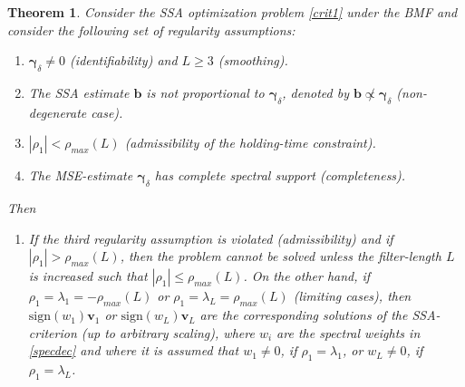 \documentclass[a4paper]{article}
\newtheorem{Theorem}{Theorem}
\begin{document}
\begin{Theorem}\label{lambda}
Consider the SSA optimization problem \ref{crit1} under the BMF and consider the following set of regularity assumptions:
\begin{enumerate}
\item $\boldsymbol{\gamma}_{\delta}\neq 0$ (identifiability) and $L\geq 3$ (smoothing).
\item The SSA estimate $\mathbf{b}$ is not proportional to $\boldsymbol{\gamma}_{\delta}$, denoted by $\mathbf{b}\not\propto\boldsymbol{\gamma}_{\delta}$ (non-degenerate case).
\item $|\rho_1|<\rho_{max}(L)$ (admissibility of the holding-time constraint).%
\item The MSE-estimate $\boldsymbol{\gamma}_{\delta}$ has complete spectral support (completeness).
\end{enumerate}
Then
\begin{enumerate}

\item \label{ass0}If the third regularity assumption is violated (admissibility) and if $|\rho_1|>\rho_{max}(L)$, then the problem cannot be solved unless the filter-length $L$ is increased such that $|\rho_1|\leq\rho_{max}(L)$. On the other hand, if $\rho_1=\lambda_1=-\rho_{max}(L)$ or $\rho_1=\lambda_L=\rho_{max}(L)$ (limiting cases), then $\textrm{sign}(w_1)\mathbf{v}_{1}$ or $\textrm{sign}(w_L)\mathbf{v}_{L}$ are the corresponding solutions of the SSA-criterion (up to arbitrary scaling), where $w_i$ are the spectral weights in \ref{specdec} and where it is assumed that $w_1\neq 0$, if $\rho_1=\lambda_1$, or $w_L\neq 0$, if $\rho_1=\lambda_L$.   


\end{enumerate}
\end{Theorem}
\end{document}
